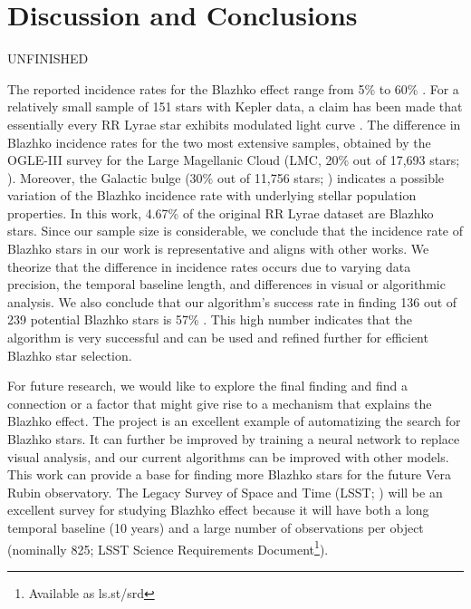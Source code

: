 
\section{Discussion and Conclusions\label{sec:discussion}}

UNFINISHED

The reported incidence rates for the Blazhko effect
range from 5\% \citep{2007MNRAS.377.1263S} to 60\% \citep{2014A&A...570A.100S}. For a relatively small sample of
151 stars with Kepler data, a claim has been made that essentially every RR Lyrae star exhibits modulated light curve
\citep{2018A&A...614L...4K}. The difference in Blazhko incidence rates for the two most extensive samples, obtained
by the OGLE-III survey for the Large Magellanic Cloud (LMC, 20\% out of 17,693 stars; \citealt{2009AcA....59....1S}).
Moreover, the Galactic bulge (30\% out of 11,756 stars; \citealt{2011AcA....61....1S}) indicates a possible variation of
the Blazhko incidence rate with underlying stellar population properties. In this work, 4.67\% of the original RR Lyrae dataset are Blazhko stars. Since our sample size is considerable, we conclude that the incidence rate of Blazhko stars in our work is representative and aligns with other works. We theorize that the difference in incidence rates occurs due to varying data precision, the temporal baseline length, and differences in visual or algorithmic analysis.
We also conclude that our algorithm's success rate in finding 136 out of 239 potential Blazhko stars is 57\% . This high number indicates that the algorithm is very successful and can be used and refined further for efficient Blazhko star selection. 

For future research, we would like to explore the final finding and find a connection or a factor that might give rise to a mechanism that explains the Blazhko effect. The project is an excellent example of automatizing the search for Blazhko stars. It can further be improved by training a neural network to replace visual analysis, and our current algorithms can be improved with other models. This work can provide a base for finding more Blazhko stars for the future Vera Rubin observatory. The Legacy Survey of Space and Time (LSST; \citealt{2019ApJ...873..111I}) will be an excellent survey for studying Blazhko effect
\citep{2022ApJS..258....4H} because it will have both a long temporal
baseline (10 years) and a large number of observations per object
(nominally 825; LSST Science Requirements Document\footnote{Available as ls.st/srd}).


